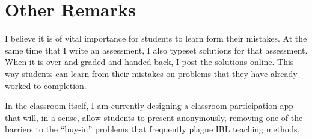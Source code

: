 \documentclass[11pt]{article}
\begin{document}
\section{Other Remarks}

I believe it is of vital importance for students to learn form their
mistakes. At the same time that I write an assessment, I also typeset solutions
for that assessment. When it is over and graded and handed back, I post the
solutions online. This way students can learn from their mistakes on problems
that they have already worked to completion.

In the classroom itself, I am currently designing a classroom participation app
that will, in a sense, allow students to present anonymously, removing one of
the barriers to the ``buy-in'' problems that frequently plague IBL teaching
methods.
\end{document}
